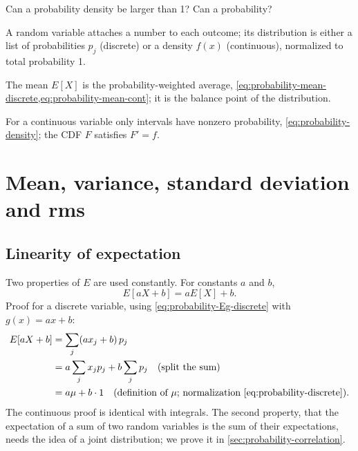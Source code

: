 \begin{checkpoint}
Can a probability density be larger than 1? Can a probability?
\end{checkpoint}

\begin{keyideas}

\item A random variable attaches a number to each outcome; its distribution is either a list of probabilities $p_j$ (discrete) or a density $f(x)$ (continuous), normalized to total probability 1.
\item The mean $E[X]$ is the probability-weighted average, \cref{eq:probability-mean-discrete,eq:probability-mean-cont}; it is the balance point of the distribution.
\item For a continuous variable only intervals have nonzero probability, \cref{eq:probability-density}; the CDF $F$ satisfies $F'=f$.

\end{keyideas}

\section{Mean, variance, standard deviation and rms}\label{sec:probability-moments}

\subsection{Linearity of expectation}

Two properties of $E$ are used constantly. For constants $a$ and $b$,
\begin{equation}
E[aX+b] = aE[X]+b .
\label{eq:probability-linear}
\end{equation}
Proof for a discrete variable, using \cref{eq:probability-Eg-discrete} with $g(x)=ax+b$:
\begin{align*}
E[aX+b] &= \sum_j (a x_j + b)\,p_j\\
&= a\sum_j x_j p_j + b\sum_j p_j \quad\text{(split the sum)}\\
&= a\mu + b\cdot 1 \quad\text{(definition of $\mu$; normalization \cref{eq:probability-discrete})}.
\end{align*}
The continuous proof is identical with integrals. The second property, that the expectation of a sum of two random variables is the sum of their expectations, needs the idea of a joint distribution; we prove it in \cref{sec:probability-correlation}.


